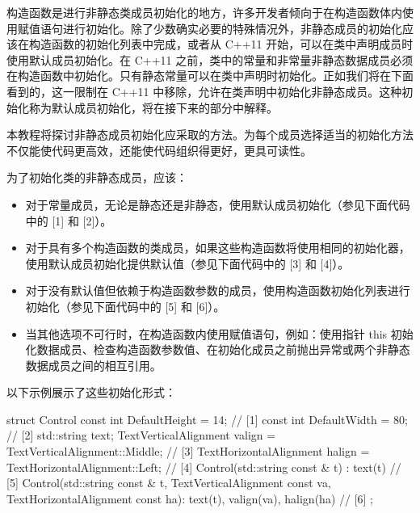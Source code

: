 
构造函数是进行非静态类成员初始化的地方，许多开发者倾向于在构造函数体内使用赋值语句进行初始化。除了少数确实必要的特殊情况外，非静态成员的初始化应该在构造函数的初始化列表中完成，或者从 C++11 开始，可以在类中声明成员时使用默认成员初始化。在 C++11 之前，类中的常量和非常量非静态数据成员必须在构造函数中初始化。只有静态常量可以在类中声明时初始化。正如我们将在下面看到的，这一限制在 C++11 中移除，允许在类声明中初始化非静态成员。这种初始化称为默认成员初始化，将在接下来的部分中解释。

本教程将探讨非静态成员初始化应采取的方法。为每个成员选择适当的初始化方法不仅能使代码更高效，还能使代码组织得更好，更具可读性。


为了初始化类的非静态成员，应该：

\begin{itemize}
\item
对于常量成员，无论是静态还是非静态，使用默认成员初始化（参见下面代码中的 [1] 和 [2]）。

\item
对于具有多个构造函数的类成员，如果这些构造函数将使用相同的初始化器，使用默认成员初始化提供默认值（参见下面代码中的 [3] 和 [4]）。

\item
对于没有默认值但依赖于构造函数参数的成员，使用构造函数初始化列表进行初始化（参见下面代码中的 [5] 和 [6]）。

\item
当其他选项不可行时，在构造函数内使用赋值语句，例如：使用指针 this 初始化数据成员、检查构造函数参数值、在初始化成员之前抛出异常或两个非静态数据成员之间的相互引用。
\end{itemize}

以下示例展示了这些初始化形式：

\begin{cpp}
struct Control
{
    const int DefaultHeight = 14;                                // [1]
    const int DefaultWidth  = 80;                                // [2]
    std::string text;
        TextVerticalAlignment valign = TextVerticalAlignment::Middle;   // [3]
        TextHorizontalAlignment halign = TextHorizontalAlignment::Left; // [4]
    Control(std::string const & t) : text(t)      // [5]
    {}
    Control(std::string const & t,
        TextVerticalAlignment const va,
        TextHorizontalAlignment const ha):
        text(t), valign(va), halign(ha)             // [6]
    {}
};
\end{cpp}


